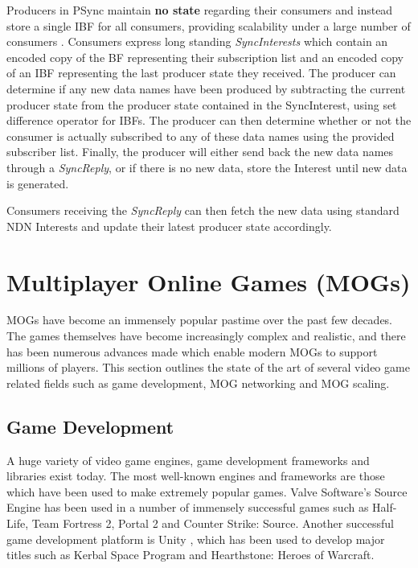Producers in PSync maintain \textbf{no state} regarding their consumers and instead store a single IBF for all consumers, providing scalability under a large number of consumers \cite{psync}. Consumers express long standing \textit{SyncInterests} which contain an encoded copy of the BF representing their subscription list and an encoded copy of an IBF representing the last producer state they received. The producer can determine if any new data names have been produced by subtracting the current producer state from the producer state contained in the SyncInterest, using set difference operator for IBFs. The producer can then determine whether or not the consumer is actually subscribed to any of these data names using the provided subscriber list. Finally, the producer will either send back the new data names through a \textit{SyncReply}, or if there is no new data, store the Interest until new data is generated.

Consumers receiving the \textit{SyncReply} can then fetch the new data using standard NDN Interests and update their latest producer state accordingly. 







\section{Multiplayer Online Games (MOGs)}\label{sec:mogs}
MOGs have become an immensely popular pastime over the past few decades. The games themselves have become increasingly complex and realistic, and there has been numerous advances made which enable modern MOGs to support millions of players. This section outlines the state of the art of several video game related fields such as game development, MOG networking and MOG scaling.   

\subsection{Game Development}
A huge variety of video game engines, game development frameworks and libraries exist today. The most well-known engines and frameworks are those which have been used to make extremely popular games. Valve Software's Source Engine \cite{source-networking} has been used in a number of immensely successful games such as Half-Life, Team Fortress 2, Portal 2 and Counter Strike: Source. Another successful game development platform is Unity \cite{unity}, which has been used to develop major titles such as Kerbal Space Program and Hearthstone: Heroes of Warcraft.

